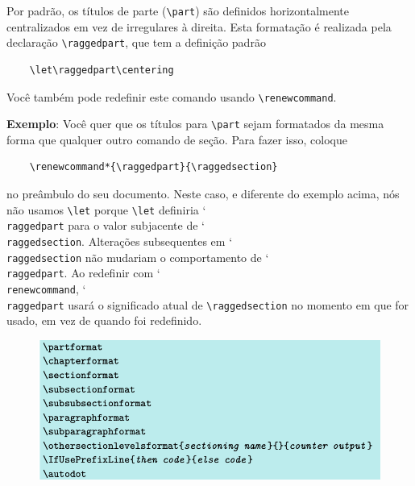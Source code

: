 Por padrão, os títulos de parte (\verb|\part|) são definidos horizontalmente centralizados em vez de irregulares à direita. Esta formatação é realizada pela declaração \verb|\raggedpart|, que tem a definição padrão
\begin{verbatim}
    \let\raggedpart\centering
\end{verbatim}


Você também pode redefinir este comando usando \verb|\renewcommand|.

\textbf{Exemplo}: Você quer que os títulos para \verb|\part| sejam formatados da mesma forma que qualquer outro comando de seção. Para fazer isso, coloque
\begin{verbatim}
    \renewcommand*{\raggedpart}{\raggedsection}
\end{verbatim}

no preâmbulo do seu documento. Neste caso, e diferente do exemplo acima, nós não usamos \verb|\let| porque \verb|\let| definiria \char`\\\texttt{rag\-ged\-part} para o valor subjacente de \char`\\\texttt{rag\-ged\-sec\-tion}. Alterações subsequentes em \char`\\\texttt{rag\-ged\-sec\-tion} não mudariam o comportamento de \char`\\\texttt{rag\-ged\-part}. Ao redefinir com \char`\\\texttt{re\-new\-com\-mand}, \char`\\\texttt{rag\-ged\-part} usará o significado atual de \verb|\raggedsection| no momento em que for usado, em vez de quando foi redefinido.

\begin{figure}
    \centering
    \includegraphics[width=0.8\linewidth]{imagem23.png}
\end{figure}

